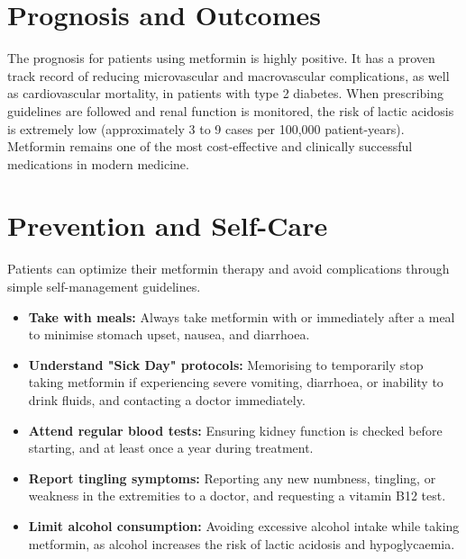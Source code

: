 \section*{Prognosis and Outcomes}
The prognosis for patients using metformin is highly positive. It has a proven track record of reducing microvascular and macrovascular complications, as well as cardiovascular mortality, in patients with type 2 diabetes. When prescribing guidelines are followed and renal function is monitored, the risk of lactic acidosis is extremely low (approximately 3 to 9 cases per 100,000 patient-years). Metformin remains one of the most cost-effective and clinically successful medications in modern medicine.

\section*{Prevention and Self-Care}
Patients can optimize their metformin therapy and avoid complications through simple self-management guidelines.
\begin{itemize}
    \item \textbf{Take with meals:} Always take metformin with or immediately after a meal to minimise stomach upset, nausea, and diarrhoea.
    \item \textbf{Understand "Sick Day" protocols:} Memorising to temporarily stop taking metformin if experiencing severe vomiting, diarrhoea, or inability to drink fluids, and contacting a doctor immediately.
    \item \textbf{Attend regular blood tests:} Ensuring kidney function is checked before starting, and at least once a year during treatment.
    \item \textbf{Report tingling symptoms:} Reporting any new numbness, tingling, or weakness in the extremities to a doctor, and requesting a vitamin B12 test.
    \item \textbf{Limit alcohol consumption:} Avoiding excessive alcohol intake while taking metformin, as alcohol increases the risk of lactic acidosis and hypoglycaemia.
\end{itemize}


